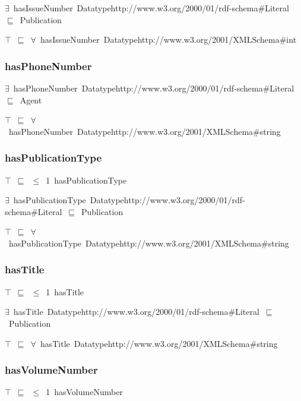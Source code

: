 \documentclass{article}
\begin{document}
\ensuremath{\exists}~hasIssueNumber~Datatypehttp://www.w3.org/2000/01/rdf-schema#Literal~\ensuremath{\sqsubseteq}~Publication

\ensuremath{\top}~\ensuremath{\sqsubseteq}~\ensuremath{\forall}~hasIssueNumber~Datatypehttp://www.w3.org/2001/XMLSchema#int

\subsubsection*{hasPhoneNumber}

\ensuremath{\exists}~hasPhoneNumber~Datatypehttp://www.w3.org/2000/01/rdf-schema#Literal~\ensuremath{\sqsubseteq}~Agent

\ensuremath{\top}~\ensuremath{\sqsubseteq}~\ensuremath{\forall}~hasPhoneNumber~Datatypehttp://www.w3.org/2001/XMLSchema#string

\subsubsection*{hasPublicationType}

\ensuremath{\top}~\ensuremath{\sqsubseteq}~\ensuremath{\leq}~1~hasPublicationType

\ensuremath{\exists}~hasPublicationType~Datatypehttp://www.w3.org/2000/01/rdf-schema#Literal~\ensuremath{\sqsubseteq}~Publication

\ensuremath{\top}~\ensuremath{\sqsubseteq}~\ensuremath{\forall}~hasPublicationType~Datatypehttp://www.w3.org/2001/XMLSchema#string

\subsubsection*{hasTitle}

\ensuremath{\top}~\ensuremath{\sqsubseteq}~\ensuremath{\leq}~1~hasTitle

\ensuremath{\exists}~hasTitle~Datatypehttp://www.w3.org/2000/01/rdf-schema#Literal~\ensuremath{\sqsubseteq}~Publication

\ensuremath{\top}~\ensuremath{\sqsubseteq}~\ensuremath{\forall}~hasTitle~Datatypehttp://www.w3.org/2001/XMLSchema#string

\subsubsection*{hasVolumeNumber}

\ensuremath{\top}~\ensuremath{\sqsubseteq}~\ensuremath{\leq}~1~hasVolumeNumber
\end{document}
